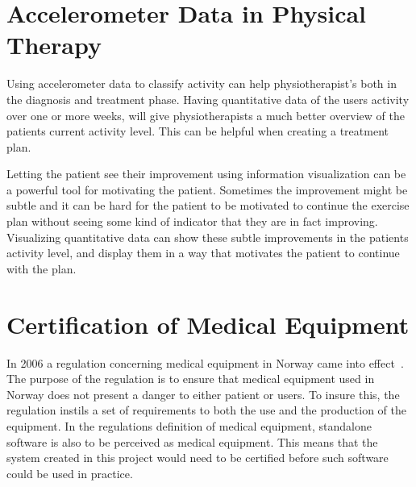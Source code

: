 \section{Accelerometer Data in Physical Therapy}
Using accelerometer data to classify activity can help physiotherapist's both in the diagnosis and treatment phase. Having quantitative data of the users activity over one or more weeks, will give physiotherapists a much better overview of the patients current activity level. This can be helpful when creating a treatment plan.

Letting the patient see their improvement using information visualization can be a powerful tool for motivating the patient. Sometimes the improvement might be subtle and it can be hard for the patient to be motivated to continue the exercise plan without seeing some kind of indicator that they are in fact improving. Visualizing quantitative data can show these subtle improvements in the patients activity level, and display them in a way that motivates the patient to continue with the plan.  

\section{Certification of Medical Equipment}
\label{sec:medicalEquipment}
In 2006 a regulation concerning medical equipment in Norway came into effect~\cite{medicalEquipment}. The purpose of the regulation is to ensure that medical equipment used in Norway does not present a danger to either patient or users. To insure this, the regulation instils a set of requirements to both the use and the production of the equipment. In the regulations definition of medical equipment, standalone software is also to be perceived as medical equipment. This means that the system created in this project would need to be certified before such software could be used in practice. 
